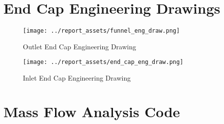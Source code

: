 \chapter{End Cap Engineering Drawings}

\begin{figure}[htbp]
    \centering
    \begin{minipage}{0.8\textwidth}
        \centering
        \texttt{[image: ../report\_assets/funnel\_eng\_draw.png]}
        \caption{Outlet End Cap Engineering Drawing}
    \end{minipage}    
\end{figure}  

\begin{figure}[htbp]
    \centering
    \begin{minipage}{0.8\textwidth}
        \centering
        \texttt{[image: ../report\_assets/end\_cap\_eng\_draw.png]}
        \caption{Inlet End Cap Engineering Drawing}
    \end{minipage}    
\end{figure}  

\chapter{Mass Flow Analysis Code}

